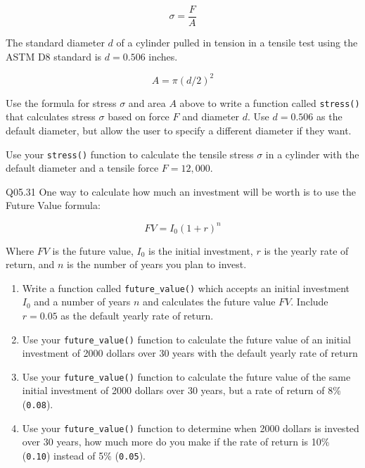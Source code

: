 \documentclass{book}
\begin{document}
\[ \sigma = \frac{F}{A} \]

The standard diameter \(d\) of a cylinder pulled in tension in a tensile
test using the ASTM D8 standard is \(d=0.506\) inches.

\[ A = \pi(d/2)^2 \]

Use the formula for stress \(\sigma\) and area \(A\) above to write a
function called \lstinline!stress()! that calculates stress \(\sigma\)
based on force \(F\) and diameter \(d\). Use \(d=0.506\) as the default
diameter, but allow the user to specify a different diameter if they
want.

Use your \lstinline!stress()! function to calculate the tensile stress
\(\sigma\) in a cylinder with the default diameter and a tensile force
\(F = 12,000\).

Q05.31 One way to calculate how much an investment will be worth is to
use the Future Value formula:

\[ FV = I_0(1 + r)^n \]

Where \(FV\) is the future value, \(I_0\) is the initial investment,
\(r\) is the yearly rate of return, and \(n\) is the number of years you
plan to invest.

\begin{enumerate}
\def\labelenumi{(\alph{enumi})}
\item
  Write a function called \lstinline!future_value()! which accepts an
  initial investment \(I_0\) and a number of years \(n\) and calculates
  the future value \(FV\). Include \(r=0.05\) as the default yearly rate
  of return.
\item
  Use your \lstinline!future_value()! function to calculate the future
  value of an initial investment of 2000 dollars over 30 years with the
  default yearly rate of return
\item
  Use your \lstinline!future_value()! function to calculate the future
  value of the same initial investment of 2000 dollars over 30 years,
  but a rate of return of 8\% (\lstinline!0.08!).
\item
  Use your \lstinline!future_value()! function to determine when 2000
  dollars is invested over 30 years, how much more do you make if the
  rate of return is 10\% (\lstinline!0.10!) instead of 5\%
  (\lstinline!0.05!).
\end{enumerate}
    
\end{document}
